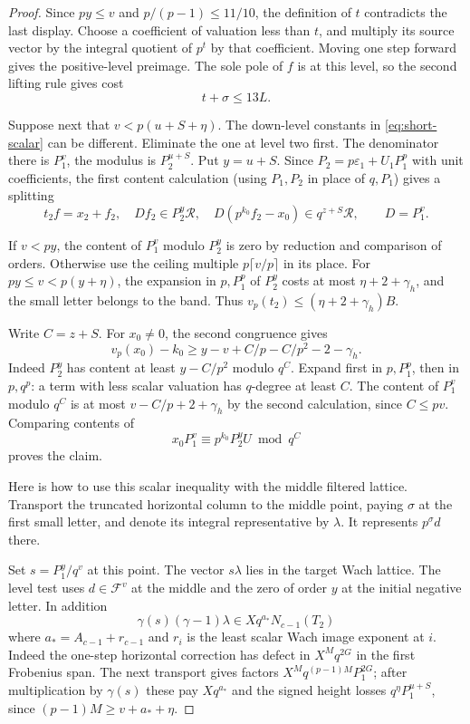 \begin{proof}
Since \(py\le v\) and \(p/(p-1)\le11/10\), the definition
of \(t\) contradicts the last display. Choose a coefficient
of valuation less than \(t\), and multiply its source vector by
the integral quotient of \(p^t\) by that coefficient.
Moving one step forward gives the positive-level preimage.
The sole pole of \(f\) is at this level, so the second lifting
rule gives cost
\[
 t+\sigma\le13L.
\]


Suppose next that \(v<p(u+S+\eta)\). The down-level constants
in \eqref{eq:short-scalar} can be different. Eliminate the one
at level two first. The denominator there is \(P_1^v\), the
modulus is \(P_2^{u+S}\). Put \(y=u+S\). Since
\(P_2=p\varepsilon_1+U_1P_1^p\) with unit coefficients, the
first content calculation (using \(P_1,P_2\) in place of
\(q,P_1\)) gives a splitting
\[
 t_2f=x_2+f_2,\quad D f_2\in P_2^{y}\mathcal R,\quad
 D(p^{k_0}f_2-x_0)\in q^{z+S}\mathcal R,\qquad D=P_1^v .
\]

If \(v<py\), the content of \(P_1^v\) modulo \(P_2^y\)
is zero by reduction and comparison of orders. Otherwise use
the ceiling multiple \(p\lceil v/p\rceil\) in its place.
For \(py\le v<p(y+\eta)\), the expansion in \(p,P_1^p\) of \(P_2^y\) costs
at most \(\eta+2+\gamma_h\), and the small letter belongs to
the band. Thus \(v_p(t_2)\le(\eta+2+\gamma_h)B\).

Write \(C=z+S\). For \(x_0\ne0\), the second congruence gives
\begin{equation}\label{eq:short-last-constant}
 v_p(x_0)-k_0\ge y-v+C/p-C/p^2-2-\gamma_h .
\end{equation}
Indeed \(P_2^y\) has content at least \(y-C/p^2\) modulo
\(q^C\). Expand first in \(p,P_1^p\), then in \(p,q^p\):
a term with less scalar valuation has \(q\)-degree at least
\(C\). The content of \(P_1^v\) modulo \(q^C\) is at most
\(v-C/p+2+\gamma_h\) by the second calculation, since
\(C\le pv\). Comparing contents of
\[
 x_0P_1^v\equiv p^{k_0}P_2^y U\bmod q^C
\]
proves the claim.

Here is how to use this scalar inequality with the middle
filtered lattice. Transport the truncated horizontal column to
the middle point, paying \(\sigma\) at the first small letter,
and denote its integral representative by \(\lambda\). It
represents \(p^\sigma d\) there.

Set \(s=P_1^y/q^v\) at this
point. The vector \(s\lambda\) lies in the target Wach lattice.
The level test uses \(d\in\mathcal F^v\) at the middle and
the zero of order \(y\) at the initial negative letter.
In addition
\[
 \gamma(s)(\gamma-1)\lambda\in Xq^{a_*}N_{c-1}(T_2)
\]
where \(a_*=A_{c-1}+r_{c-1}\) and \(r_i\) is the least
scalar Wach image exponent at \(i\). Indeed the one-step
horizontal correction has defect in \(X^M q^{2G}\) in the
first Frobenius span. The next transport gives factors
\(X^M q^{(p-1)M}P_1^{2G}\); after multiplication by
\(\gamma(s)\) these pay \(Xq^{a_*}\) and the signed height losses
\(q^\eta P_1^{u+S}\), since \((p-1)M\ge v+a_*+\eta\).


\end{proof}
